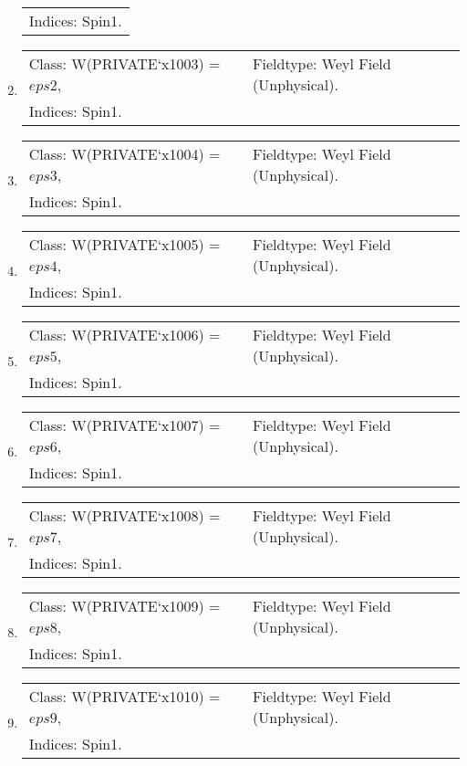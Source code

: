 \documentclass[11pt]{article}
\begin{document}
\begin{enumerate}
\begin{tabular}{ll}
\multicolumn{2}{l}{Indices: Spin1.}\\ 
\end{tabular}
\item 
\begin{tabular}{ll}
Class: W(PRIVATE`x1003) = $ eps2 $, &  Fieldtype: Weyl Field (Unphysical).\\ 
\multicolumn{2}{l}{Indices: Spin1.}\\ 
\end{tabular}
\item 
\begin{tabular}{ll}
Class: W(PRIVATE`x1004) = $ eps3 $, &  Fieldtype: Weyl Field (Unphysical).\\ 
\multicolumn{2}{l}{Indices: Spin1.}\\ 
\end{tabular}
\item 
\begin{tabular}{ll}
Class: W(PRIVATE`x1005) = $ eps4 $, &  Fieldtype: Weyl Field (Unphysical).\\ 
\multicolumn{2}{l}{Indices: Spin1.}\\ 
\end{tabular}
\item 
\begin{tabular}{ll}
Class: W(PRIVATE`x1006) = $ eps5 $, &  Fieldtype: Weyl Field (Unphysical).\\ 
\multicolumn{2}{l}{Indices: Spin1.}\\ 
\end{tabular}
\item 
\begin{tabular}{ll}
Class: W(PRIVATE`x1007) = $ eps6 $, &  Fieldtype: Weyl Field (Unphysical).\\ 
\multicolumn{2}{l}{Indices: Spin1.}\\ 
\end{tabular}
\item 
\begin{tabular}{ll}
Class: W(PRIVATE`x1008) = $ eps7 $, &  Fieldtype: Weyl Field (Unphysical).\\ 
\multicolumn{2}{l}{Indices: Spin1.}\\ 
\end{tabular}
\item 
\begin{tabular}{ll}
Class: W(PRIVATE`x1009) = $ eps8 $, &  Fieldtype: Weyl Field (Unphysical).\\ 
\multicolumn{2}{l}{Indices: Spin1.}\\ 
\end{tabular}
\item 
\begin{tabular}{ll}
Class: W(PRIVATE`x1010) = $ eps9 $, &  Fieldtype: Weyl Field (Unphysical).\\ 
\multicolumn{2}{l}{Indices: Spin1.}\\ 
\end{tabular}
\end{enumerate}
\end{document}
